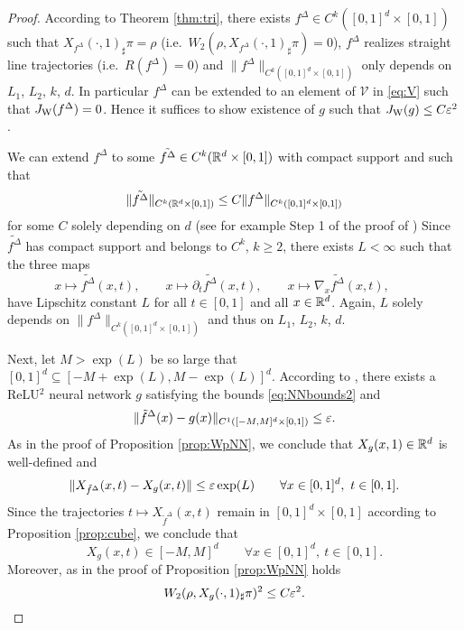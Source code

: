 \begin{proof}
  According to Theorem \ref{thm:tri}, there exists
  ${f^\Delta}\in C^k([0,1]^d\times [0,1])$ such that
  $X_{f^\Delta}(\cdot,1)_\sharp\pi=\rho$ (i.e.\
  $W_2(\rho,X_{f^\Delta}(\cdot,1)_\sharp\pi)=0$), ${f^\Delta}$ realizes straight line
  trajectories (i.e.\ $R({f^\Delta})=0$) and $\|{f^\Delta}\|_{C^k([0,1]^d\times [0,1])}$
  only depends on $L_1$, $L_2$, $k$, $d$. In particular ${f^\Delta}$ can be
  extended to an element of $\mathcal{V}$ in \eqref{eq:V}
  such that $J_{\rm W}({f^\Delta})=0$. Hence it
  suffices to show existence of $g$ such that $J_{\rm W}(g)\le C\varepsilon^2$.

  We can extend ${f^\Delta}$ to some $\tilde {f^\Delta}\in C^k(\mathbb{R}^d\times [0,1])$ with
  compact support and such that
  \begin{equation*}
    \|\tilde {f^\Delta}\|_{C^k(\mathbb{R}^d\times [0,1])}\le C \|{f^\Delta}\|_{C^k([0,1]^d\times[0,1])}
  \end{equation*}
  for some $C$ solely depending on $d$ (see for example Step 1 of the
  proof of \cite[Theorem 33]{StatisticalNODE}) %
  Since $\tilde {f^\Delta}$ has
  compact support and belongs to $C^k$, $k\ge 2$, there exists
  $L<\infty$ such that the three maps
  \begin{equation*}
    x\mapsto \tilde {f^\Delta}(x,t),\qquad
    x\mapsto \partial_t\tilde {f^\Delta}(x,t),\qquad
    x\mapsto \nabla_x\tilde {f^\Delta}(x,t),\qquad
  \end{equation*}
  have Lipschitz constant $L$ for all $t\in [0,1]$ and all
  $x\in\mathbb{R}^d$. Again, $L$ solely depends on
  $\|{f^\Delta}\|_{C^k([0,1]^d\times [0,1])}$ and thus on $L_1$, $L_2$, $k$,
  $d$.

  Next, let $M>\exp(L)$ be so large that
  $[0,1]^d \subseteq [-M+\exp(L),M-\exp(L)]^d$.  According to
  \cite[Theorem 16]{StatisticalNODE},
  there exists a ReLU$^2$ neural
  network $g$ satisfying the bounds \eqref{eq:NNbounds2} and 
  \begin{equation}\label{eq:f-geps2}
    \|{\tilde f^\Delta}(x)-g(x)\|_{C^1([-M,M]^d\times [0,1])}\le\varepsilon.
  \end{equation}
  As in the proof of Proposition \ref{prop:WpNN}, we conclude that
  $X_g(x,1)\in\mathbb{R}^d$ is well-defined and
  \begin{equation*}
    \|X_{\tilde f^\Delta}(x,t)-X_g(x,t)\|\le \varepsilon \exp(L)\qquad\forall x\in[0,1]^d,~t\in [0,1].
  \end{equation*}
  Since the trajectories $t\mapsto X_{\tilde f^\Delta}(x,t)$ remain in
  $[0,1]^d\times [0,1]$ according to Proposition \ref{prop:cube}, we conclude that
  \begin{equation}\label{eq:trajectoriesM}
    X_g(x,t)\in [-M,M]^d\qquad\forall x\in [0,1]^d,~t\in [0,1].
  \end{equation}
  Moreover, as in the proof of Proposition \ref{prop:WpNN} holds
  \begin{equation*}
    W_2(\rho,X_g(\cdot,1)_\sharp\pi)^2\le C\varepsilon^2.
  \end{equation*}


\end{proof}
